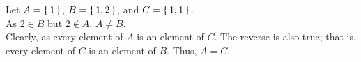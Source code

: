 \guard



\begin{exmp}
\label{exmp:setEquality}
  Let $A=\left\{\,1\,\right\}$, $B=\left\{\,1,2\,\right\}$, and $C=\left\{\,1,1\,\right\}$.\\

  As $2\in B$ but $2\not\in A$, $A\not= B$.\\

  Clearly, as every element of $A$ is an element of $C$.
  The reverse is also true; that is, every element of $C$ is an element of $B$.
  Thus, $A=C$.
\end{exmp}

